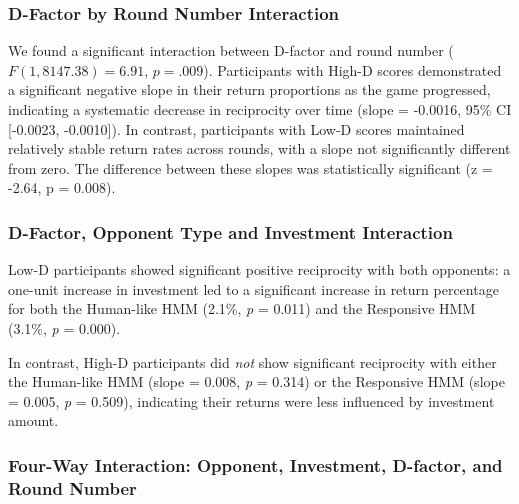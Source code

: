 \documentclass[
]{article}
\begin{document}
\subsubsection{D-Factor by Round Number Interaction}\label{d-factor-by-round-number-interaction}

We found a significant interaction between D-factor and round number (\(F(1, 8147.38) = 6.91\), \(p = .009\)). Participants with High-D scores demonstrated a significant negative slope in their return proportions as the game progressed, indicating a systematic decrease in reciprocity over time (slope = -0.0016, 95\% CI {[}-0.0023, -0.0010{]}). In contrast, participants with Low-D scores maintained relatively stable return rates across rounds, with a slope not significantly different from zero. The difference between these slopes was statistically significant (z = -2.64, p = 0.008).

\subsubsection{D-Factor, Opponent Type and Investment Interaction}\label{d-factor-opponent-type-and-investment-interaction}

Low-D participants showed significant positive reciprocity with both opponents: a one-unit increase in investment led to a significant increase in return percentage for both the Human-like HMM (2.1\%, \emph{p} = 0.011) and the Responsive HMM (3.1\%, \emph{p} = 0.000).

In contrast, High-D participants did \emph{not} show significant reciprocity with either the Human-like HMM (slope = 0.008, \emph{p} = 0.314) or the Responsive HMM (slope = 0.005, \emph{p} = 0.509), indicating their returns were less influenced by investment amount.

\subsubsection{Four-Way Interaction: Opponent, Investment, D-factor, and Round Number}\label{four-way-interaction-opponent-investment-d-factor-and-round-number}
\end{document}

